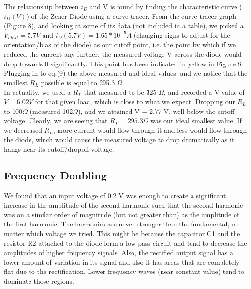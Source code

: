 \documentclass{article}
\begin{document}
    The relationship between $i_D$ and V is found by finding the characteristic curve ($i_D (V)$) of the Zener Diode using a curve tracer. From the curve tracer graph (Figure 8), and looking at some of its data (not included in a table), we picked a $V_{ideal} = 5.7V$ and $i_D (5.7V) = 1.65*10^{-5}A$ (changing signs to adjust for the orientation/bias of the diode) as our cutoff point, i.e. the point by which if we reduced the current any further, the measured voltage V across the diode would drop towards 0 significantly. This point has been indicated in yellow in Figure 8. Plugging in to eq.(9) the above measured and ideal values, and we notice that the smallest $R_L$ possible is equal to 295.3 $\Omega$.\\\indent In actuality, we used a $R_L$ that measured to be 325 $\Omega$, and recorded a V-value of $V = 6.02 V$ for that given load, which is close to what we expect. Dropping our $R_L$ to 100$\Omega$ (measured 102$\Omega$), and we attained V = 2.77 V, well below the cutoff voltage. Clearly, we are seeing that $R_L = 295.3\Omega$ was our ideal smallest value. If we decreased $R_L$, more current would flow through it and less would flow through the diode, which would cause the measured voltage to drop dramatically as it hangs near its cutoff/dropoff voltage.

\subsection{Frequency Doubling}
    We found that an input voltage of 0.2 V was enough to create a significant increase in the amplitude of the second harmonic such that the second harmonic was on a similar order of magnitude (but not greater than) as the amplitude of the first harmonic. The harmonics are never stronger than the fundamental, no matter which voltage we tried. This might be because the capacitor C1 and the resistor R2 attached to the diode form a low pass circuit and tend to decrease the amplitudes of higher frequency signals. Also, the rectified output signal has a lower amount of variation in its signal and also it has areas that are completely flat due to the rectification. Lower frequency waves (near constant value) tend to dominate those regions.
\end{document}
